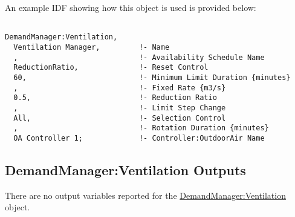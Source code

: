 An example IDF showing how this object is used is provided below:

\begin{lstlisting}

DemandManager:Ventilation,
  Ventilation Manager,         !- Name
  ,                            !- Availability Schedule Name
  ReductionRatio,              !- Reset Control
  60,                          !- Minimum Limit Duration {minutes}
  ,                            !- Fixed Rate {m3/s}
  0.5,                         !- Reduction Ratio
  ,                            !- Limit Step Change
  All,                         !- Selection Control
  ,                            !- Rotation Duration {minutes}
  OA Controller 1;             !- Controller:OutdoorAir Name
\end{lstlisting}

\subsection{DemandManager:Ventilation Outputs}\label{demandmanagerventilation-outputs}

There are no output variables reported for the \hyperref[demandmanagerventilation]{DemandManager:Ventilation} object.